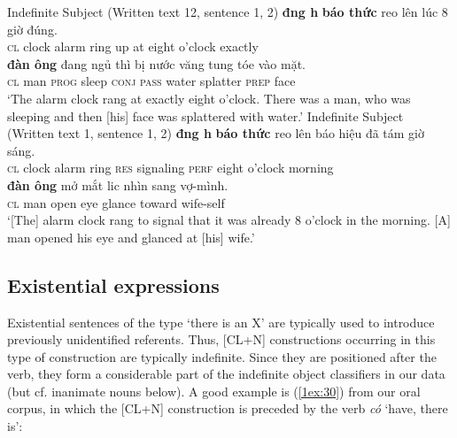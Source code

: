 \documentclass[output=paper]{langsci/langscibook}
\begin{document}
\begin{exe}
\ex\label{1ex:28}
Indefinite Subject (Written text 12, sentence 1, 2)
\exi{}
 {\textbf{đ{\daob}ng h{\daob}}} {\textbf{báo thức}}  reo   lên  lúc   8         giờ        đúng. \\
{\textsc{cl}}     clock       alarm       ring  up   at     eight  o'clock  exactly \\
\glt 
\exi{}
 {\textbf{đàn ông}}  đang    ngủ    thì        bị       nước   {văng tung tóe}   vào     mặt. \\
{\textsc{cl}}      man         {\textsc{prog}} sleep  {\textsc{conj}}  {\textsc{pass}}  water  splatter            {\textsc{prep}} face \\
\glt `The alarm clock rang at exactly eight o'clock. There was a man, who was sleeping and then [his] face was splattered with water.'
\ex\label{1ex:29}
Indefinite Subject (Written text 1, sentence 1, 2)
\exi{}
 {\textbf{đ{\daob}ng h{\daob}}} {\textbf{báo thức}}   reo   lên     {báo hiệu}    đã 	       tám 	giờ 	     sáng. \\
{\textsc{cl}}     clock      alarm         ring  {\textsc{res}}  signaling   {\textsc{perf}}  eight	o'clock  morning \\
\glt 
\exi{}
 {\textbf{đàn ông}} 	mở    mắt 	{li{\dae}c nhìn} 	sang 	     vợ-mình. \\
{\textsc{cl}}      man          open eye 	glance        toward    wife-self \\
\glt `[The] alarm clock rang to signal that it was already 8 o'clock in the morning. [A] man opened his eye and glanced at [his] wife.'
\end{exe}


\subsection{Existential expressions}\label{1sec:42}
Existential sentences of the type `there is an X' are typically used to introduce previously unidentified referents. Thus, [CL+N] constructions occurring in this type of construction are typically indefinite. Since they are positioned after the verb, they form a considerable part of the indefinite object classifiers in our data (but cf. inanimate nouns below). A good example is (\ref{1ex:30}) from our oral corpus, in which the [CL+N] construction is preceded by the verb {\emph{có}} `have, there is':
\end{document}
